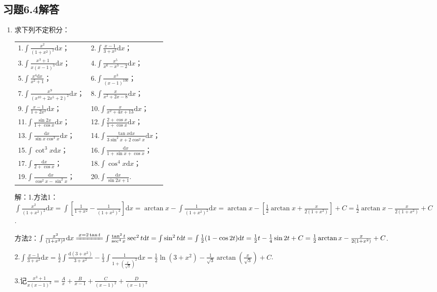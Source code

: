 \documentclass[12pt,UTF8]{ctexart}
\begin{document}
\subsection{习题6.4解答}
\begin{enumerate}
\item[]求下列不定积分：
\newline
\begin{tabular}{ll}
1.$\int\frac{x^2}{(1+x^2)^2}\mathrm dx$；&2.$\int\frac{x-1}{3+x^2}\mathrm dx$；\\
3.$\int\frac{x^3+1}{x(x-1)^3}\mathrm dx$；&4.$\int\frac{x^5}{x^6-x^3-2}\mathrm dx$；\\
5.$\int\frac{x^4\mathrm dx}{x^2+1}$；&6.$\int\frac{x^3}{(x-1)^{100}}$；\\
7.$\int\frac{x^9}{(x^{10}+2x^5+2)^2}\mathrm dx$；&8.$\int\frac x{x^2+2x-8}\mathrm dx$；\\
9.$\int\frac{x-1}{1+2x^2}\mathrm dx$；&10.$\int\frac x{x^2+4x+13}\mathrm dx$；\\
11.$\int\frac{\sin2x}{1+\cos x}\mathrm dx$；&12.$\int\frac{2+\cos x}{1+\cos x}\mathrm dx$；\\
13.$\int\frac{\mathrm dx}{\sin x\cos^3x}\mathrm dx$；&14.$\int\frac{\tan x\mathrm dx}{3\sin^2x+2\cos^2x}\mathrm dx$；\\
15.$\int\cot^3x\mathrm dx$；&16.$\int\frac{\mathrm dx}{1+\sin x+\cos x}$；\\
17.$\int\frac{\mathrm dx}{2+\cos x}$；&18.$\int\cos^4x\mathrm dx$；\\
19.$\int\frac{\mathrm dx}{\cos^2x-\sin^2x}$；&20.$\int\frac{\mathrm dx}{\sin2x+1}$.
\end{tabular}

解：1.方法1：$\int\frac{x^2}{(1+x^2)^2}\mathrm dx=\int[\frac1{1+x^2}-\frac1{(1+x^2)^2}]\mathrm dx=\arctan x-\int\frac1{(1+x^2)^2}\mathrm dx=\arctan x-[\frac12\arctan x+\frac x{2(1+x^2)}]+C=\frac12\arctan x-\frac x{2(1+x^2)}+C$.

方法2：$\int\frac{x^2}{(1+x^2)^2}\mathrm dx\xlongequal{x=2\tan t}\int\frac{\tan^2t}{\sec^4x}\sec^2t\mathrm dt=\int\sin^2t\mathrm dt=\int\frac12(1-\cos2t)\mathrm dt=\frac12t-\frac14\sin2t+C=\frac12\arctan x-\frac x{2(1+x^2)}+C$.

2.$\int\frac{x-1}{3+x^2}\mathrm dx=\frac12\int\frac{\mathrm d(3+x^2)}{3+x^2}-\frac13\int\frac1{1+(\frac x{\sqrt3})^2}\mathrm dx=\frac12\ln(3+x^2)-\frac1{\sqrt3}\arctan(\frac x{\sqrt3})+C$.

3.记$\frac{x^3+1}{x(x-1)^3}=\frac Ax+\frac B{x-1}+\frac C{(x-1)^2}+\frac D{(x-1)^3}$


\end{enumerate}
\end{document}
